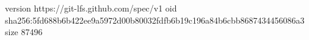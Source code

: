 version https://git-lfs.github.com/spec/v1
oid sha256:5fd688b6b422ee9a5972d00b80032fdfb6b19c196a84b6cbb8687434456086a3
size 87496
